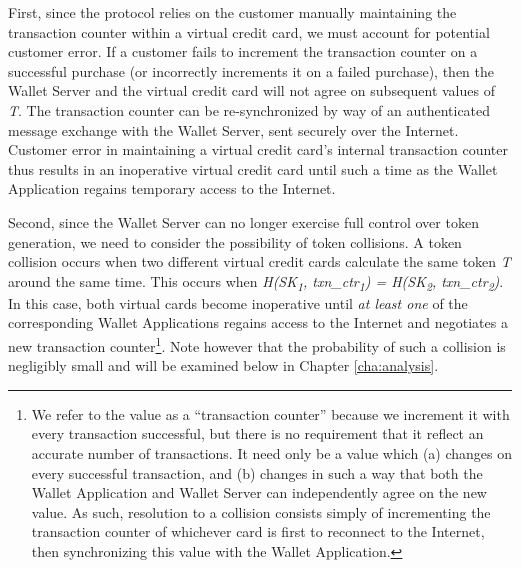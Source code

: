First, since the protocol relies on the customer manually maintaining the transaction counter within a virtual credit card,
    we must account for potential customer error.
If a customer fails to increment the transaction counter on a successful purchase (or incorrectly increments it on a failed purchase),
    then the Wallet Server and the virtual credit card will not agree on subsequent values of \emph{T}.
The transaction counter can be re-synchronized by way of an authenticated message exchange with the Wallet Server, sent securely over the Internet.
Customer error in maintaining a virtual credit card's internal transaction counter thus results in an inoperative virtual credit card
    until such a time as the Wallet Application regains temporary access to the Internet.

Second, since the Wallet Server can no longer exercise full control over token generation, we need to consider the possibility of token collisions.
A token collision occurs when two different virtual credit cards calculate the same token \emph{T} around the same time.
This occurs when \emph{H(SK\textsubscript{1}, txn\_ctr\textsubscript{1}) = H(SK\textsubscript{2}, txn\_ctr\textsubscript{2})}.
In this case, both virtual cards become inoperative until \emph{at least one} of the corresponding Wallet Applications regains access to the Internet
    and negotiates a new transaction counter\footnote{
    We refer to the value as a ``transaction counter'' because we increment it with every transaction successful,
        but there is no requirement that it reflect an accurate number of transactions.
    It need only be a value which (a) changes on every successful transaction, and
        (b) changes in such a way that both the Wallet Application and Wallet Server can independently agree on the new value.
    As such, resolution to a collision consists simply of incrementing the transaction counter of whichever card is first to reconnect to the Internet,
        then synchronizing this value with the Wallet Application.
    }.
Note however that the probability of such a collision is negligibly small and will be examined below in Chapter \ref{cha:analysis}.